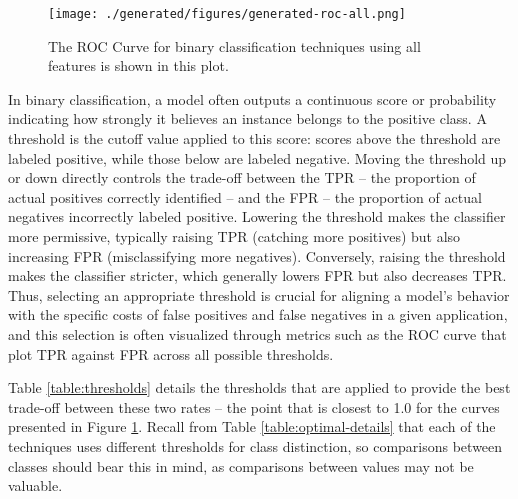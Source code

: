 \documentclass[letterpaper, notitlepage]{report}
\begin{document}
{

}




\begin{figure}[!htbp]
	\centering
	\texttt{[image: ./generated/figures/generated-roc-all.png]}
	\caption[ROC Curve for binary classification using all features]{The ROC Curve for binary classification techniques using all features is shown in this plot.}
	\label{fig:roc}
\end{figure}


In binary classification, a model often outputs a continuous score or probability indicating how strongly it believes an instance belongs to the positive class. A threshold is the cutoff value applied to this score: scores above the threshold are labeled positive, while those below are labeled negative. Moving the threshold up or down directly controls the trade-off between the \gls{TPR} -- the proportion of actual positives correctly identified -- and the \gls{FPR} -- the proportion of actual negatives incorrectly labeled positive. Lowering the threshold makes the classifier more permissive, typically raising \gls{TPR} (catching more positives) but also increasing \gls{FPR} (misclassifying more negatives). Conversely, raising the threshold makes the classifier stricter, which generally lowers \gls{FPR} but also decreases \gls{TPR}. Thus, selecting an appropriate threshold is crucial for aligning a model's behavior with the specific costs of false positives and false negatives in a given application, and this selection is often visualized through metrics such as the \gls{ROC} curve that plot TPR against FPR across all possible thresholds.

 Table \ref{table:thresholds} details the thresholds that are applied to provide the best trade-off between  these two rates -- the point that is closest to 1.0 for the curves presented in Figure \ref{fig:roc}. Recall from Table \ref{table:optimal-details} that each of the techniques uses different thresholds for class distinction, so comparisons between classes should bear this in mind, as comparisons between values may not be valuable.
\end{document}
